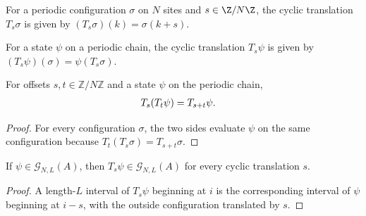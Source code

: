 \begin{definition}
    \label{def:parent_cyclic_translate_configuration}
    \leanok
    For a periodic configuration $\sigma$ on $N$ sites and $s\in\Z/N\Z$,
    the cyclic translation $T_s\sigma$ is given by $(T_s\sigma)(k)=\sigma(k+s)$.
\end{definition}

\begin{definition}
    \label{def:parent_cyclic_translate_state}
    \leanok
    For a state $\psi$ on a periodic chain, the cyclic translation $T_s\psi$ is
    given by $(T_s\psi)(\sigma)=\psi(T_s\sigma)$.
\end{definition}

\begin{lemma}
    \label{thm:parent_cyclic_translate_add}
    \leanok
    For offsets $s,t\in\mathbb Z/N\mathbb Z$ and a state $\psi$ on the
    periodic chain,
    \begin{align}
        T_s(T_t\psi) & =T_{s+t}\psi.
        \notag
    \end{align}
\end{lemma}

\begin{proof}
    \leanok
    For every configuration $\sigma$, the two sides evaluate $\psi$ on the
    same configuration because $T_t(T_s\sigma)=T_{s+t}\sigma$.
\end{proof}

\begin{lemma}
    \label{lem:parent_cyclic_translate_preserves_chain_space}
    \leanok
    If $\psi\in\mathcal G_{N,L}(A)$, then
    $T_s\psi\in\mathcal G_{N,L}(A)$ for every cyclic translation $s$.
\end{lemma}

\begin{proof}
    \leanok
    A length-$L$ interval of $T_s\psi$ beginning at $i$ is the corresponding
    interval of $\psi$ beginning at $i-s$, with the outside configuration
    translated by $s$.
\end{proof}


